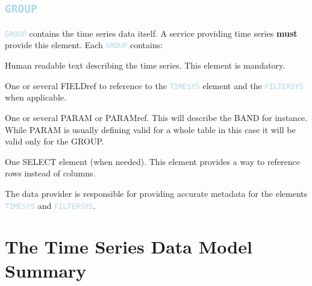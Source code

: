 \documentclass[11pt,a4paper]{ivoa}
\newcommand\elem[1]{\textcolor{LightBlue}{{\tt#1}}}
\begin{document}
\subsection{\elem{GROUP}}
\elem{GROUP} contains the time series data itself. A service providing time series \textbf{must} provide this element. 
Each \elem{GROUP} contains:
\begin{description}
     \item[\elem{DESCRIPTION}] Human readable text describing the time series. This element is mandatory. 
     \item[\elem{FIELDref}] One or several FIELDref to reference to the \elem{TIMESYS} element and the \elem{FILTERSYS} when applicable. 
     \item One or several PARAM or PARAMref. This will describe the BAND for instance. While PARAM is usually defining valid for a whole table in this case it will be valid only for the GROUP.  
     \item One SELECT element (when needed). This element provides a way to reference rows instead of columns. 
\end{description}

The data provider is responsible for providing accurate metadata for the elements \elem{TIMESYS} and \elem{FILTERSYS}. 



\section{The Time Series Data Model Summary}
\end{document}
